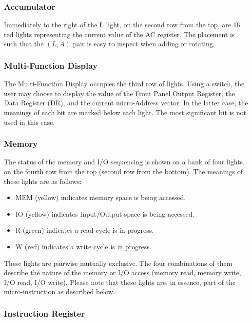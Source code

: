 \documentclass[11pt,a4paper,twocolumns]{article}
\newcommand{\lt}[1]{\textsf{#1}}
\newcommand\register[1]{\textsf{#1}}
\newcommand\A{\register{AC}}
\newcommand\DR{\register{DR}}
\begin{document}
\subsubsection{Accumulator}

Immediately to the right of the \lt{L} light, on the second row from the top,
are 16 red lights representing the current value of the \A{} register. The
placement is such that the $(L,A)$ pair is easy to inspect when adding or
rotating.

\subsubsection{Multi-Function Display}

The Multi-Function Display occupies the third row of lights. Using a switch,
the user may choose to display the value of the Front Panel Output Register,
the Data Register (\DR), and the current micro-Address vector. In the latter
case, the meanings of each bit are marked below each light. The most
significant bit is not used in this case.

\subsubsection{Memory}

The status of the memory and I/O sequencing is shown on a bank of four lights,
on the fourth row from the top (second row from the bottom). The meanings of
these lights are as follows:

\begin{itemize}
\item \lt{MEM} (yellow) indicates memory space is being accessed.
\item \lt{IO} (yellow) indicates Input/Output space is being accessed.
\item \lt{R} (green) indicates a read cycle is in progress.
\item \lt{W} (red) indicates a write cycle is in progress.
\end{itemize}

These lights are pairwise mutually exclusive. The four combinations of them
describe the nature of the memory or I/O access (memory read, memory write, I/O
read, I/O write). Please note that these lights are, in essence, part of the
micro-instruction as described below.

\subsubsection{Instruction Register}
\end{document}
